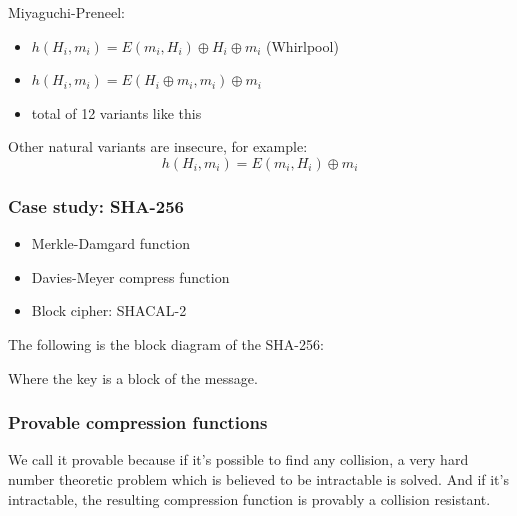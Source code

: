 \documentclass[12pt]{book}
\begin{document}
Miyaguchi-Preneel:
\begin{itemize}
	\item[] $h(H_{i},m_{i})=E(m_{i},H_{i})\oplus H_{i}\oplus m_{i}$ (Whirlpool)
	\item[] $h(H_{i},m_{i})=E(H_{i}\oplus m_{i},m_{i})\oplus m_{i}$
	\item[] total of 12 variants like this
\end{itemize}
Other natural variants are insecure, for example: $$h(H_{i},m_{i})=E(m_{i},H_{i})\oplus m_{i}$$

\subsubsection{Case study: SHA-256}
\begin{itemize}
	\item Merkle-Damgard function
	\item Davies-Meyer compress function
	\item Block cipher: SHACAL-2
\end{itemize}

The following is the block diagram of the SHA-256:
\begin{center}
\end{center}Where the key is a block of the message.

\subsubsection{Provable compression functions}
We call it provable because if it's possible to find any collision, a very hard number theoretic problem which is believed to be intractable is solved. And if it's intractable, the resulting compression function is provably a collision resistant.
\end{document}
